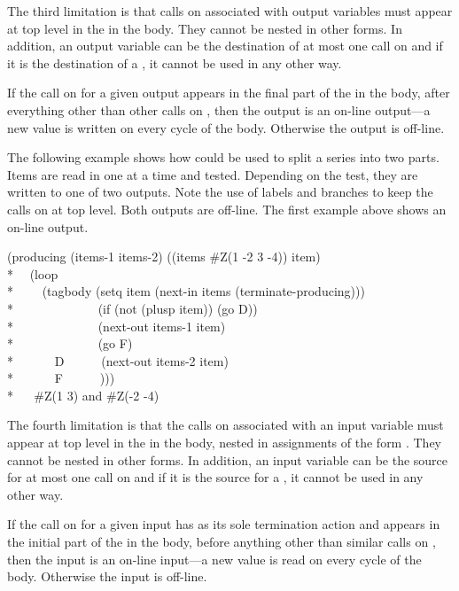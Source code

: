 \begin{defmac}
The third limitation is that calls on  associated with
output variables must appear at top level in the  in the
body.  They cannot be nested in other forms.  In addition, an
output variable can be the destination of at most one call on 
 and if it is the destination of a , it cannot
be used in any other way.

If the call on  for a given output appears in the
final part of the  in the body, after everything
other than other calls on , then the output is an
on-line output---a new value is written on every cycle of the
body.  Otherwise the output is off-line.

The following example shows how  could be used to split
a series into two parts.  Items are read in one at a time and tested.
Depending on the test, they are written to one of two outputs.  Note
the use of labels and branches to keep the calls on 
 at top level.  Both outputs are off-line.  The first example
above shows an on-line output.
\begin{lisp}
(producing (items-1 items-2) ((items \#Z(1 -2 3 -4)) item) \\*
~~(loop \\*
~~~~(tagbody (setq item (next-in items (terminate-producing))) \\*
~~~~~~~~~~~~~(if (not (plusp item)) (go D)) \\*
~~~~~~~~~~~~~(next-out items-1 item) \\*
~~~~~~~~~~~~~(go F) \\*
~~~~~~D~~~~~~(next-out items-2 item) \\*
~~~~~~F~~~~~~))) \\*
~~{\EV} \#Z(1 3) {\rm and} \#Z(-2 -4)
\end{lisp}

The fourth limitation is that the calls on  associated with an
input variable  must appear at top level in the  in the
body, nested in assignments of the form 
.  They cannot be nested in other
forms.  In addition, an input variable can be the source for at most one
call on  and if it is the source for a , it
cannot be used in any other way.

If the call on  for a given input has as its sole
termination action  and
appears in the initial part of the  in the body,
before anything other than similar calls on , then the
input is an on-line input---a new value is read on every cycle of the
body.  Otherwise the input is off-line.


\end{defmac}
